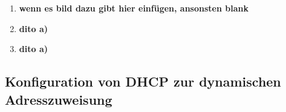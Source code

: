 \documentclass{scrartcl}
\begin{document}
  \renewcommand{\labelenumi}{\alph{enumi})}
  \begin{enumerate}
  \item
  \textbf{wenn es bild dazu gibt hier einfügen, ansonsten blank}
  
  \item
  \textbf{dito a)}
  
  \item
  \textbf{dito a)}
  \end{enumerate}
  
  \subsection[Aufgabe 5 Konfiguration von DHCP zur dynamischen Adresszuweisung]{Konfiguration von DHCP zur dynamischen Adresszuweisung}
  
\end{document}

